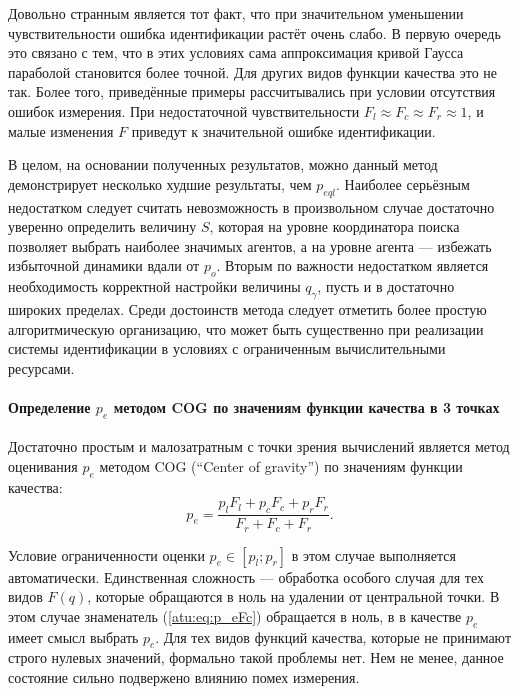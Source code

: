 Довольно странным является тот факт, что при значительном уменьшении
чувствительности ошибка идентификации растёт очень слабо.
В первую очередь это связано с тем, что в этих условиях
сама аппроксимация кривой Гаусса параболой становится более точной.
Для других видов функции качества это не так.
Более того, приведённые примеры рассчитывались при условии
отсутствия ошибок измерения. При недостаточной чувствительности
$F_l \approx F_c \approx F_r \approx 1$, и малые изменения $F$
приведут к значительной ошибке идентификации.



В целом, на основании полученных результатов, можно данный метод
демонстрирует несколько худшие результаты, чем $p_{eql}$.
Наиболее серьёзным недостатком следует считать
невозможность в произвольном случае достаточно уверенно
определить величину $S$, которая на уровне координатора поиска
позволяет выбрать наиболее значимых агентов, а на уровне агента ---
избежать избыточной динамики вдали от $p_o$.
Вторым по важности недостатком является необходимость
корректной настройки величины $q_\gamma$, пусть и в достаточно широких пределах.
Среди достоинств метода следует отметить более простую
алгоритмическую организацию, что может быть существенно
при реализации системы идентификации в условиях с ограниченным вычислительными
ресурсами.



\paragraph{Определение $p_e$ методом COG по значениям функции качества в 3 точках}

Достаточно простым и малозатратным с точки зрения вычислений
является метод оценивания $p_e$ методом COG (``Center of gravity'')
по значениям функции качества:
%
\begin{equation}
  p_e =
  \frac{p_l F_l + p_c F_c + p_r F_r}{ F_r + F_c + F_r}  .
  \label{atu:eq:p_eFc}
\end{equation}

Условие ограниченности оценки
$p_e \in [p_l;p_r]$ в этом случае выполняется автоматически.
Единственная сложность --- обработка особого случая для тех видов
$F(q)$, которые обращаются в ноль на удалении от центральной точки.
В этом случае знаменатель (\ref{atu:eq:p_eFc}) обращается в ноль,
в в качестве $p_e$ имеет смысл выбрать $p_c$.
Для тех видов функций качества, которые не принимают строго нулевых
значений, формально такой проблемы нет. Нем не менее,
данное состояние сильно подвержено влиянию помех измерения.


